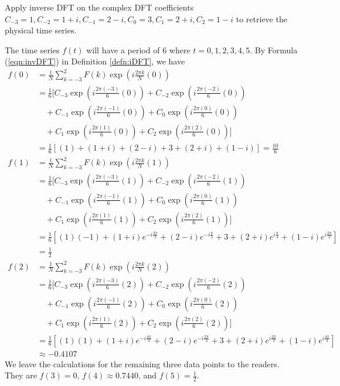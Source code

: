\begin{exmp}
Apply inverse DFT on the complex DFT coefficients $C_{-3} = 1, C_{-2} = 1 + i, C_{-1} = 2 - i, C_0 = 3, C_1 = 2 + i, C_2 = 1 - i$ to retrieve the physical time series.
\end{exmp}
\begin{solution}
The time series $f(t)$ will have a period of $6$ where $t = 0,1,2,3,4,5$. By Formula (\ref{eqn:invDFT}) in Definition \ref{defn:iDFT}, we have
\begin{align*}
f(0) &= \frac{1}{N}\sum_{k=-3}^{2} F(k)\exp(i\frac{2\pi k}{N}(0)) \\
&= \frac{1}{6}[C_{-3}\exp(i\frac{2\pi (-3)}{6}(0)) + C_{-2}\exp(i\frac{2\pi (-2)}{6}(0)) \\
&\quad + C_{-1}\exp(i\frac{2\pi (-1)}{6}(0)) + C_{0}\exp(i\frac{2\pi (0)}{6}(0)) \\
&\quad + C_{1}\exp(i\frac{2\pi (1)}{6}(0)) + C_{2}\exp(i\frac{2\pi (2)}{6}(0))] \\
&= \frac{1}{6}[(1) + (1+i) + (2-i) + 3 + (2+i) + (1-i)] = \frac{10}{6} \\
f(1) &= \frac{1}{N}\sum_{k=-3}^{2} F(k)\exp(i\frac{2\pi k}{N}(1)) \\
&= \frac{1}{6}[C_{-3}\exp(i\frac{2\pi (-3)}{6}(1)) + C_{-2}\exp(i\frac{2\pi (-2)}{6}(1)) \\
&\quad + C_{-1}\exp(i\frac{2\pi (-1)}{6}(1)) + C_{0}\exp(i\frac{2\pi (0)}{6}(1)) \\
&\quad + C_{1}\exp(i\frac{2\pi (1)}{6}(1)) + C_{2}\exp(i\frac{2\pi (2)}{6}(1))] \\
&= \frac{1}{6}[(1)(-1) + (1+i)e^{-i \frac{2\pi}{3}} + (2-i)e^{-i \frac{\pi}{3}} + 3 + (2+i)e^{i \frac{\pi}{3}} + (1-i)e^{i \frac{2\pi}{3}}] \\
&= \frac{1}{2} \\
f(2) &= \frac{1}{N}\sum_{k=-3}^{2} F(k)\exp(i\frac{2\pi k}{N}(2)) \\
&= \frac{1}{6}[C_{-3}\exp(i\frac{2\pi (-3)}{6}(2)) + C_{-2}\exp(i\frac{2\pi (-2)}{6}(2)) \\
&\quad + C_{-1}\exp(i\frac{2\pi (-1)}{6}(2)) + C_{0}\exp(i\frac{2\pi (0)}{6}(2)) \\
&\quad + C_{1}\exp(i\frac{2\pi (1)}{6}(2)) + C_{2}\exp(i\frac{2\pi (2)}{6}(2))] \\
&= \frac{1}{6}[(1)(1) + (1+i)e^{-i \frac{4\pi}{3}} + (2-i)e^{-i \frac{2\pi}{3}} + 3 + (2+i)e^{i \frac{2\pi}{3}} + (1-i)e^{i \frac{4\pi}{3}}] \\
&\approx -0.4107 
\end{align*}
We leave the calculations for the remaining three data points to the readers. They are $f(3) = 0$, $f(4) \approx 0.7440$, and $f(5) = \frac{1}{2}$.
\end{solution}


